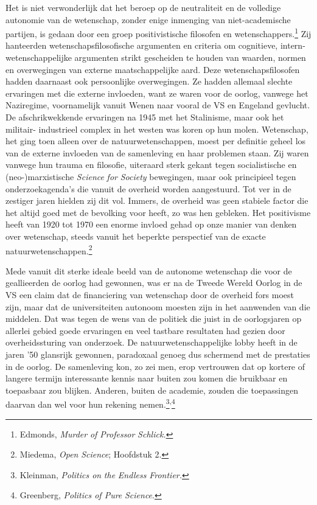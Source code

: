 \documentclass[smallauthor, chapterhaspagenum, nochapterinheader, pagenuminheader,  bigchapnum,medium2, tocpages, garamond, titleinheader]{jote-book}
\begin{document}
	Het is niet verwonderlijk dat het beroep op de neutraliteit en de volledige autonomie van de wetenschap, zonder enige inmenging van niet-academische partijen, is gedaan door een groep positivistische filosofen en wetenschappers.\footnote{Edmonds, \emph{Murder}\emph{ of Professor }\emph{Schlick}\emph{.}} Zij hanteerden wetenschapsfilosofische argumenten en criteria om cognitieve, intern-wetenschappelijke argumenten strikt gescheiden te houden van waarden, normen en overwegingen van externe maatschappelijke aard. Deze wetenschapsfilosofen hadden daarnaast ook persoonlijke overwegingen. Ze hadden allemaal slechte ervaringen met die externe invloeden, want ze waren voor de oorlog, vanwege het Naziregime, voornamelijk vanuit Wenen naar vooral de VS en Engeland gevlucht. De afschrikwekkende ervaringen na 1945 met het Stalinisme, maar ook het militair- industrieel complex in het westen was koren op hun molen. Wetenschap, het ging toen alleen over de natuurwetenschappen, moest per definitie geheel los van de externe invloeden van de samenleving en haar problemen staan. Zij waren vanwege hun trauma en filosofie, uiteraard sterk gekant tegen socialistische en (neo-)marxistische \emph{Science}\emph{ }\emph{for}\emph{ Society} bewegingen, maar ook principieel tegen onderzoekagenda's die vanuit de overheid worden aangestuurd. Tot ver in de zestiger jaren hielden zij dit vol. Immers, de overheid was geen stabiele factor die het altijd goed met de bevolking voor heeft, zo was hen gebleken. Het positivisme heeft van 1920 tot 1970 een enorme invloed gehad op onze manier van denken over wetenschap, steeds vanuit het beperkte perspectief van de exacte natuurwetenschappen.\footnote{Miedema, \emph{Open }\emph{Science}; Hoofdstuk 2. }



	Mede vanuit dit sterke ideale beeld van de autonome wetenschap die voor de geallieerden de oorlog had gewonnen, was er na de Tweede Wereld Oorlog in de VS een claim dat de financiering van wetenschap door de overheid fors moest zijn, maar dat de universiteiten autonoom moesten zijn in het aanwenden van die middelen. Dat was tegen de wens van de politiek die juist in de oorlogsjaren op allerlei gebied goede ervaringen en veel tastbare resultaten had gezien door overheidssturing van onderzoek. De natuurwetenschappelijke lobby heeft in de jaren '50 glansrijk gewonnen, paradoxaal genoeg dus schermend met de prestaties in de oorlog. De samenleving kon, zo zei men, erop vertrouwen dat op kortere of langere termijn interessante kennis naar buiten zou komen die bruikbaar en toepasbaar zou blijken. Anderen, buiten de academie, zouden die toepassingen daarvan dan wel voor hun rekening nemen.\footnote{Kleinman, \emph{Politics on }\emph{the}\emph{ }\emph{Endless}\emph{ Frontier}\emph{.}}\textsuperscript{,}\footnote{Greenberg, \emph{Politics of Pure }\emph{Science}.}
\end{document}
